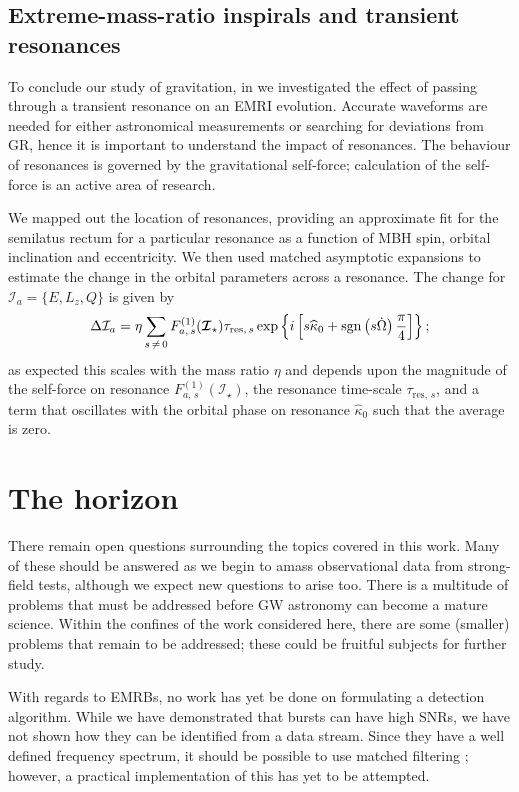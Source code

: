 \subsection{Extreme-mass-ratio inspirals and transient resonances}\label{sec:Review-resonances}

To conclude our study of gravitation, in  we investigated the effect of passing through a transient resonance on an EMRI evolution. Accurate waveforms are needed for either astronomical measurements or searching for deviations from GR, hence it is important to understand the impact of resonances. The behaviour of resonances is governed by the gravitational self-force; calculation of the self-force is an active area of research.

We mapped out the location of resonances, providing an approximate fit for the semilatus rectum for a particular resonance as a function of MBH spin, orbital inclination and eccentricity. We then used matched asymptotic expansions to estimate the change in the orbital parameters across a resonance. The change for $\mathcal{I}_a = \{E,L_z,Q\}$ is given by
\begin{equation}
\Delta \mathcal{I}_a = \eta\sum_{s\,\neq\,0}F_{a,\,s}^{(1)}(\boldsymbol{\mathcal{I}}_\star)\tau_{\mathrm{res},\,s}\exp\left\{i\left[s \widehat{\kappa}_0 +\operatorname{sgn}\left(s\dot{\Omega}\right)\dfrac{\pi}{4}\right]\right\};
\end{equation}
as expected this scales with the mass ratio $\eta$ and depends upon the magnitude of the self-force on resonance $F_{a,\,s}^{(1)}(\boldsymbol{\mathcal{I}}_\star)$, the resonance time-scale $\tau_{\mathrm{res},\,s}$, and a term that oscillates with the orbital phase on resonance $\widehat{\kappa}_0$ such that the average is zero.

\section{The horizon}

There remain open questions surrounding the topics covered in this work. Many of these should be answered as we begin to amass observational data from strong-field tests, although we expect new questions to arise too. There is a multitude of problems that must be addressed before GW astronomy can become a mature science. Within the confines of the work considered here, there are some (smaller) problems that remain to be addressed; these could be fruitful subjects for further study.

With regards to EMRBs, no work has yet be done on formulating a detection algorithm. While we have demonstrated that bursts can have high SNRs, we have not shown how they can be identified from a data stream. Since they have a well defined frequency spectrum, it should be possible to use matched filtering \citep[cf.][]{Feroz2010}; however, a practical implementation of this has yet to be attempted.

